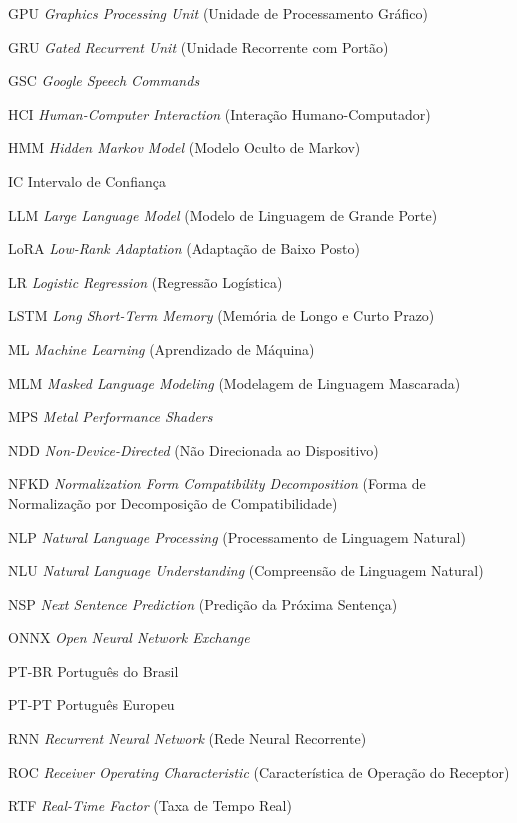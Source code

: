 \documentclass[
    12pt,                %
    openright,           %
    oneside,             %
    a4paper,             %
    english,             %
    brazil               %
]{abntex2}
\begin{document}
\begin{siglas}
  \item[GPU] \textit{Graphics Processing Unit} (Unidade de Processamento Gráfico)
  \item[GRU] \textit{Gated Recurrent Unit} (Unidade Recorrente com Portão)
  \item[GSC] \textit{Google Speech Commands}
  \item[HCI] \textit{Human-Computer Interaction} (Interação Humano-Computador)
  \item[HMM] \textit{Hidden Markov Model} (Modelo Oculto de Markov)
  \item[IC] Intervalo de Confiança
  \item[LLM] \textit{Large Language Model} (Modelo de Linguagem de Grande Porte)
  \item[LoRA] \textit{Low-Rank Adaptation} (Adaptação de Baixo Posto)
  \item[LR] \textit{Logistic Regression} (Regressão Logística)
  \item[LSTM] \textit{Long Short-Term Memory} (Memória de Longo e Curto Prazo)
  \item[ML] \textit{Machine Learning} (Aprendizado de Máquina)
  \item[MLM] \textit{Masked Language Modeling} (Modelagem de Linguagem Mascarada)
  \item[MPS] \textit{Metal Performance Shaders}
  \item[NDD] \textit{Non-Device-Directed} (Não Direcionada ao Dispositivo)
  \item[NFKD] \textit{Normalization Form Compatibility Decomposition} (Forma de Normalização por Decomposição de Compatibilidade)
  \item[NLP] \textit{Natural Language Processing} (Processamento de Linguagem Natural)
  \item[NLU] \textit{Natural Language Understanding} (Compreensão de Linguagem Natural)
  \item[NSP] \textit{Next Sentence Prediction} (Predição da Próxima Sentença)
  \item[ONNX] \textit{Open Neural Network Exchange}
  \item[PT-BR] Português do Brasil
  \item[PT-PT] Português Europeu
  \item[RNN] \textit{Recurrent Neural Network} (Rede Neural Recorrente)
  \item[ROC] \textit{Receiver Operating Characteristic} (Característica de Operação do Receptor)
  \item[RTF] \textit{Real-Time Factor} (Taxa de Tempo Real)

\end{siglas}
\end{document}
